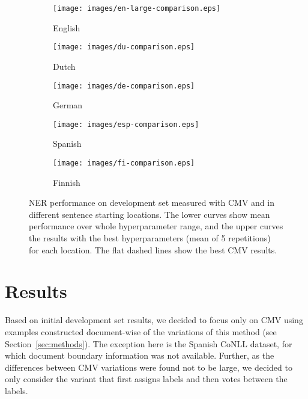 \begin{figure}[!t]
\begin{subfigure}{0.33\textwidth}
\texttt{[image: images/en-large-comparison.eps]} 
\caption{English}
\label{fig:subim1}
\end{subfigure}
\begin{subfigure}{0.33\textwidth}
\texttt{[image: images/du-comparison.eps]}
\caption{Dutch}
\label{fig:subim2}
\end{subfigure}
\begin{subfigure}{0.33\textwidth}
\texttt{[image: images/de-comparison.eps]} 
\caption{German}
\label{fig:subim3}
\end{subfigure}
\begin{subfigure}{0.33\textwidth}
\texttt{[image: images/esp-comparison.eps]}
\caption{Spanish}
\label{fig:subim4}
\end{subfigure}
\begin{subfigure}{0.33\textwidth}
\texttt{[image: images/fi-comparison.eps]}
\caption{Finnish}
\label{fig:subim5}
\end{subfigure}
\caption{NER performance on development set measured with CMV and in different sentence starting locations. The lower curves show mean performance over whole hyperparameter range, and the upper curves the results with the best hyperparameters (mean of 5 repetitions) for each location. The flat dashed lines show the best CMV results.}
\label{fig:image2}
\end{figure}

\section{Results}

Based on initial development set results, we decided to focus only on CMV using examples constructed document-wise of the variations of this method (see Section~\ref{sec:methods}). The exception here is the Spanish CoNLL dataset, for which document boundary information was not available. Further, as the differences between CMV variations were found not to be large, we decided to only consider the variant that first assigns labels and then votes between the labels. 

